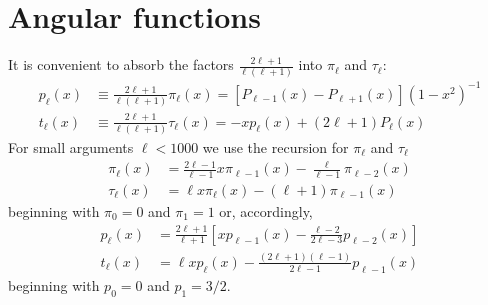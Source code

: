 \documentclass[onecolumn%
              ,superscriptaddress%
              ,aps%
              ,pra]{revtex4}
\begin{document}
\section{Angular functions}
It is convenient to absorb the factors $\frac{2\ell+1}{\ell(\ell+1)}$ into $\pi_\ell$ and $\tau_\ell$:
\begin{align}
p_\ell(x) &\equiv \frac{2\ell+1}{\ell(\ell+1)} \pi_\ell(x) = \left[P_{\ell-1}(x)-P_{\ell+1}(x)\right](1-x^2)^{-1} \\
t_\ell(x) &\equiv \frac{2\ell+1}{\ell(\ell+1)} \tau_\ell(x) = -x p_\ell(x) + (2\ell+1)P_\ell(x)
\end{align}
For small arguments $\ell<1000$ we use the recursion for $\pi_\ell$ and $\tau_\ell$ \cite{BH}
\begin{equation}
\begin{aligned}
\pi_\ell(x) &= \frac{2\ell-1}{\ell-1}x\pi_{\ell-1}(x) - \frac{\ell}{\ell-1}\pi_{\ell-2}(x) \\
\tau_\ell(x) &= \ell x \pi_\ell(x) - (\ell+1)\pi_{\ell-1}(x)
\end{aligned}
\end{equation}
beginning with $\pi_0 = 0$ and $\pi_1 = 1$ or, accordingly,
\begin{equation}
\begin{aligned}
p_\ell(x) &= \frac{2\ell+1}{\ell+1}\left[x p_{\ell-1}(x) - \frac{\ell-2}{2\ell-3}p_{\ell-2}(x)\right] \\
t_\ell(x) &= \ell x p_\ell(x) - \frac{(2\ell+1)(\ell-1)}{2\ell-1} p_{\ell-1}(x)
\end{aligned}
\end{equation}
beginning with $p_0 = 0$ and $p_1 = 3/2$.
\end{document}
